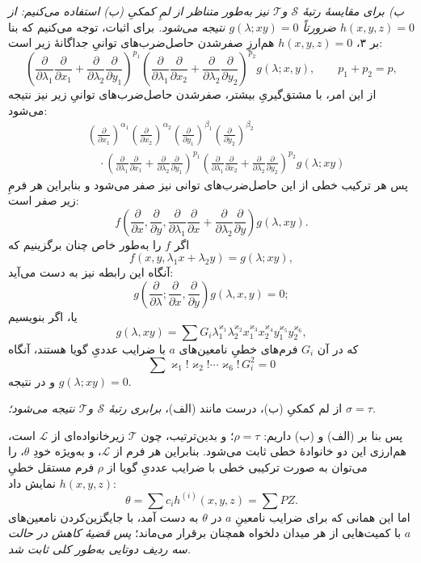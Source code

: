 \documentclass[11pt]{article}
\begin{document}
\emph{ب) برای مقایسهٔ رتبهٔ $\mathcal S$ و$\mathcal T$ نیز به‌طور متناظر از لمِ کمکیِ (ب) استفاده می‌کنیم: از $h(x,y,z)=0$ ضرورتاً $g(\lambda;xy)=0$ نتیجه می‌شود.} برای اثبات، توجه می‌کنیم که بنا بر ۳، $h(x,y,z)=0$ هم‌ارزِ صفرشدن حاصل‌ضرب‌های توانیِ جداگانهٔ زیر است:
\[
 \left(\frac{\partial}{\partial\lambda_1}\frac{\partial}{\partial x_1}
 +\frac{\partial}{\partial\lambda_2}\frac{\partial}{\partial y_1}\right)^{p_1}
 \left(\frac{\partial}{\partial\lambda_1}\frac{\partial}{\partial x_2}
 +\frac{\partial}{\partial\lambda_2}\frac{\partial}{\partial y_2}\right)^{p_2}g(\lambda;x,y),
 \qquad p_1+p_2=p,
\]
از این امر، با مشتق‌گیریِ بیشتر، صفرشدن حاصل‌ضرب‌های توانیِ زیر نیز نتیجه می‌شود:
\[
\begin{aligned}
&\left(\frac{\partial}{\partial x_1}\right)^{\alpha_1}
 \left(\frac{\partial}{\partial x_2}\right)^{\alpha_2}
 \left(\frac{\partial}{\partial y_1}\right)^{\beta_1}
 \left(\frac{\partial}{\partial y_2}\right)^{\beta_2} \\
&\quad\cdot
 \left(\frac{\partial}{\partial\lambda_1}\frac{\partial}{\partial x_1}
 +\frac{\partial}{\partial\lambda_2}\frac{\partial}{\partial y_1}\right)^{p_1}
 \left(\frac{\partial}{\partial\lambda_1}\frac{\partial}{\partial x_2}
 +\frac{\partial}{\partial\lambda_2}\frac{\partial}{\partial y_2}\right)^{p_2}
 g(\lambda;xy)
\end{aligned}
\]
پس هر ترکیب خطی از این حاصل‌ضرب‌های توانی نیز صفر می‌شود و بنابراین هر فرمِ زیر صفر است:
\[
  f\left(\frac{\partial}{\partial x},\frac{\partial}{\partial y},
  \frac{\partial}{\partial\lambda_1}\frac{\partial}{\partial x}
  +\frac{\partial}{\partial\lambda_2}\frac{\partial}{\partial y}\right)g(\lambda,xy).
\]
اگر $f$ را به‌طور خاص چنان برگزینیم که
\[
  f(x,y,\lambda_1x+\lambda_2y)=g(\lambda;xy),
\]
آنگاه این رابطه نیز به دست می‌آید:
\[
  g\left(\frac{\partial}{\partial\lambda};
    \frac{\partial}{\partial x},
    \frac{\partial}{\partial y}\right)g(\lambda,x,y)=0;
\]
یا، اگر بنویسیم
\[
  g(\lambda,xy)=\sum G_i\lambda_1^{\varkappa_1}\lambda_2^{\varkappa_2}
  x_1^{\varkappa_3}x_2^{\varkappa_4}y_1^{\varkappa_5}y_2^{\varkappa_6},
\]
که در آن $G_i$ فرم‌های خطیِ نامعین‌های $a$ با ضرایب عددیِ گویا هستند، آنگاه
\[
  \sum \varkappa_1!\varkappa_2!\cdots\varkappa_6!\,G_i^2=0
\]
و در نتیجه $g(\lambda;xy)=0$.

از لم کمکیِ (ب)، درست مانند (الف)، \emph{برابری رتبهٔ $\mathcal S$ و$\mathcal T$ نتیجه می‌شود؛ $\sigma=\tau$.}

پس بنا بر (الف) و (ب) داریم: $\rho=\tau$؛ و بدین‌ترتیب، چون $\mathcal T$ زیرخانواده‌ای از $\mathcal L$ است، هم‌ارزی این دو خانوادهٔ خطی ثابت می‌شود. بنابراین هر فرم از $\mathcal L$، و به‌ویژه خودِ $\theta$، را می‌توان به صورت ترکیبی خطی با ضرایب عددیِ گویا از $\rho$ فرم مستقل خطیِ $h(x,y,z)$ نمایش داد:
\[
  \theta=\sum c_i h^{(i)}(x,y,z)=\sum PZ.
\]
اما این همانی که برای ضرایب نامعینِ $a$ در $\theta$ به دست آمد، با جایگزین‌کردن نامعین‌های $a$ با کمیت‌هایی از هر میدان دلخواه همچنان برقرار می‌ماند؛ \emph{پس قضیهٔ کاهش در حالت سه ردیف دوتایی به‌طور کلی ثابت شد.}
\end{document}
